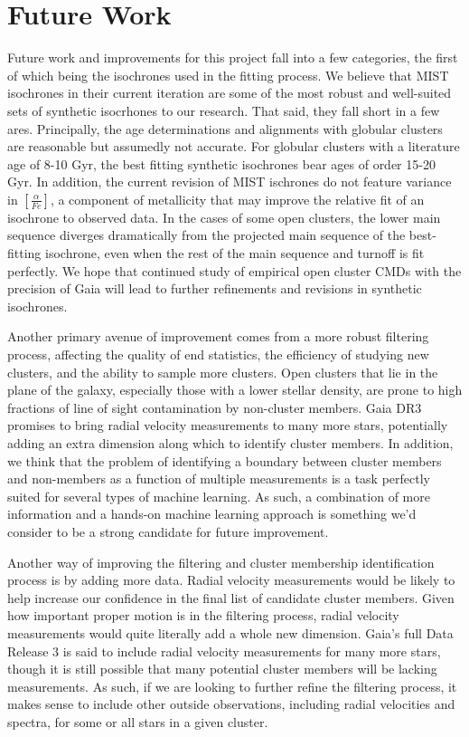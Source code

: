 \documentclass[onecolumn,table,xcdraw,super]{aastex631}
\begin{document}
\section{Future Work} \label{sec:future}

Future work and improvements for this project fall into a few categories, the first of which being the isochrones used in the fitting process. We believe that MIST isochrones in their current iteration are some of the most robust and well-suited sets of synthetic isocrhones to our research. That said, they fall short in a few ares. Principally, the age determinations and alignments with globular clusters are reasonable but assumedly not accurate. For globular clusters with a literature age of 8-10 Gyr, the best fitting synthetic isochrones bear ages of order 15-20 Gyr. In addition, the current revision of MIST ischrones do not feature variance in $[\frac{\alpha}{Fe}]$, a component of metallicity that may improve the relative fit of an isochrone to observed data. In the cases of some open clusters, the lower main sequence diverges dramatically from the projected main sequence of the best-fitting isochrone, even when the rest of the main sequence and turnoff is fit perfectly. We hope that continued study of empirical open cluster CMDs with the precision of Gaia will lead to further refinements and revisions in synthetic isochrones.

Another primary avenue of improvement comes from a more robust filtering process, affecting the quality of end statistics, the efficiency of studying new clusters, and the ability to sample more clusters. Open clusters that lie in the plane of the galaxy, especially those with a lower stellar density, are prone to high fractions of line of sight contamination by non-cluster members. Gaia DR3 promises to bring radial velocity measurements to many more stars, potentially adding an extra dimension along which to identify cluster members. In addition, we think that the problem of identifying a boundary between cluster members and non-members as a function of multiple measurements is a task perfectly suited for several types of machine learning. As such, a combination of more information and a hands-on machine learning approach is something we'd consider to be a strong candidate for future improvement.

Another way of improving the filtering and cluster membership identification process is by adding more data. Radial velocity measurements would be likely to help increase our confidence in the final list of candidate cluster members. Given how important proper motion is in the filtering process, radial velocity measurements would quite literally add a whole new dimension. Gaia's full Data Release 3 is said to include radial velocity measurements for many more stars, though it is still possible that many potential cluster members will be lacking measurements. As such, if we are looking to further refine the filtering process, it makes sense to include other outside observations, including radial velocities and spectra, for some or all stars in a given cluster.
\end{document}
